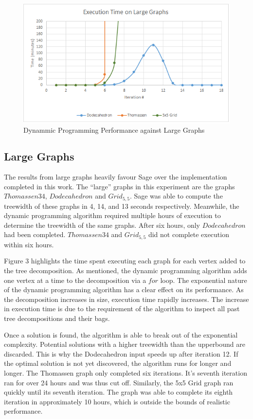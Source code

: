 \documentclass[12pt,conference]{IEEEtran}
\theoremstyle{plain}
\begin{document}
\begin{figure}[!bp]
\centering
\includegraphics[scale=1.0]{large-graph-metrics}
\caption{Dynammic Programming Performance against Large Graphs}
\end{figure}

\subsection{Large Graphs}

The results from large graphs heavily favour Sage over the implementation completed in this work. The ``large'' graphs in this experiment are the graphs $Thomassen34$, $Dodecahedron$ and $Grid_{5,5}$. Sage was able to compute the treewidth of these graphs in 4, 14, and 13 seconds respectively. Meanwhile, the dynamic programming algorithm required multiple hours of execution to determine the treewidth of the same graphs. After six hours, only $Dodecahedron$ had been completed. $Thomassen34$ and $Grid_{5,5}$ did not complete execution within six hours.

Figure 3 highlights the time spent executing each graph for each vertex added to the tree decomposition. As mentioned, the dynamic programming algorithm adds one vertex at a time to the decomposition via a $for$ loop. The exponential nature of the dynamic programming algorithm has a clear effect on its performance. As the decomposition increases in size, execution time rapidly increases. The increase in execution time is due to the requirement of the algorithm to inspect all past tree decompositions and their bags.

Once a solution is found, the algorithm is able to break out of the exponential complexity. Potential solutions with a higher treewidth than the upperbound are discarded. This is why the Dodecahedron input speeds up after iteration 12. If the optimal solution is not yet discovered, the algorithm runs for longer and longer. The Thomassen graph only completed six iterations. It's seventh iteration ran for over 24 hours and was thus cut off. Similarly, the 5x5 Grid graph ran quickly until its seventh iteration. The graph was able to complete its eighth iteration in approximately 10 hours, which is outside the bounds of realistic performance.
\end{document}
